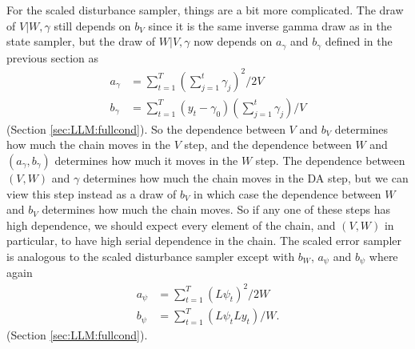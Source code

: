 \documentclass{article}
\begin{document}
For the scaled disturbance sampler, things are a bit more complicated. The draw of $V|W,\gamma$ still depends on $b_V$ since it is the same inverse gamma draw as in the state sampler, but the draw of $W|V,\gamma$ now depends on $a_\gamma$ and $b_\gamma$ defined in the previous section as 
\begin{align*}
  a_\gamma & = \sum_{t=1}^T\left(\sum_{j=1}^t\gamma_j\right)^2/2V\\
  b_\gamma &=\sum_{t=1}^T(y_t-\gamma_0)\left(\sum_{j=1}^t\gamma_j\right)/V
\end{align*}
(Section \ref{sec:LLM:fullcond}). So the dependence between $V$ and $b_V$ determines how much the chain moves in the $V$ step, and the dependence between $W$ and $(a_\gamma , b_\gamma)$ determines how much it moves in the $W$ step. The dependence between $(V,W)$ and $\gamma$ determines how much the chain moves in the DA step, but we can view this step instead as a draw of $b_V$ in which case the dependence between $W$ and $b_V$ determines how much the chain moves. So if any one of these steps has high dependence, we should expect every element of the chain, and $(V,W)$ in particular, to have high serial dependence in the chain. The scaled error sampler is analogous to the scaled disturbance sampler except with $b_W$, $a_\psi$ and $b_\psi$ where again
\begin{align*}
  a_\psi&=\sum_{t=1}^T(L\psi_t)^2/2W\\
  b_\psi&=\sum_{t=1}^T(L\psi_tLy_t)/W.
\end{align*}
(Section \ref{sec:LLM:fullcond}).
\end{document}

